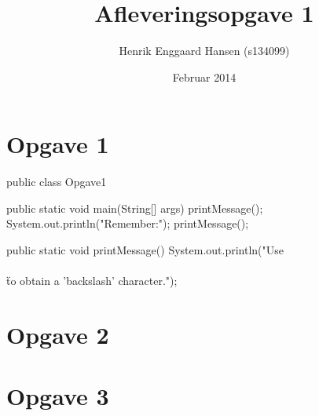 \documentclass{article}
\begin{document}

\title{Afleveringsopgave 1}
\author{Henrik Enggaard Hansen (s134099)}
\date{Februar 2014}
\maketitle

\section*{Opgave 1}
\begin{javacode}
public class Opgave1 {
	public static void main(String[] args) {
		printMessage();
		System.out.println("Remember:");
		printMessage();
	}

	public static void printMessage() {
		System.out.println("Use \"\\\\\" to obtain a ’backslash’ character.");
	}
}
\end{javacode}

\section*{Opgave 2}

\section*{Opgave 3}
\end{document}
